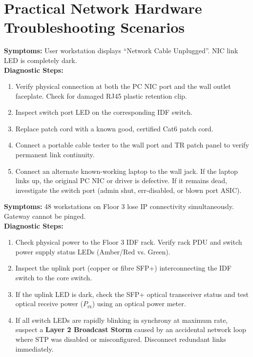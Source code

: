\section{Practical Network Hardware Troubleshooting Scenarios}

\begin{tcolorbox}[colback=white,colframe=titleblue,title=\textbf{Scenario 1: Single PC Completely Unable to Connect to Local Network}]
\textbf{Symptoms:} User workstation displays ``Network Cable Unplugged''. NIC link LED is completely dark. \\
\textbf{Diagnostic Steps:}
\begin{enumerate}[leftmargin=*]
    \item Verify physical connection at both the PC NIC port and the wall outlet faceplate. Check for damaged RJ45 plastic retention clip.
    \item Inspect switch port LED on the corresponding IDF switch.
    \item Replace patch cord with a known good, certified Cat6 patch cord.
    \item Connect a portable cable tester to the wall port and TR patch panel to verify permanent link continuity.
    \item Connect an alternate known-working laptop to the wall jack. If the laptop links up, the original PC NIC or driver is defective. If it remains dead, investigate the switch port (admin shut, err-disabled, or blown port ASIC).
\end{enumerate}
\end{tcolorbox}

\begin{tcolorbox}[colback=white,colframe=titleblue,title=\textbf{Scenario 2: Entire Floor Loses Network Connectivity Simultaneously}]
\textbf{Symptoms:} 48 workstations on Floor 3 lose IP connectivity simultaneously. Gateway cannot be pinged. \\
\textbf{Diagnostic Steps:}
\begin{enumerate}[leftmargin=*]
    \item Check physical power to the Floor 3 IDF rack. Verify rack PDU and switch power supply status LEDs (Amber/Red vs. Green).
    \item Inspect the uplink port (copper or fibre SFP+) interconnecting the IDF switch to the core switch.
    \item If the uplink LED is dark, check the SFP+ optical transceiver status and test optical receive power ($P_{\text{rx}}$) using an optical power meter.
    \item If all switch LEDs are rapidly blinking in synchrony at maximum rate, suspect a \textbf{Layer 2 Broadcast Storm} caused by an accidental network loop where STP was disabled or misconfigured. Disconnect redundant links immediately.
\end{enumerate}
\end{tcolorbox}

